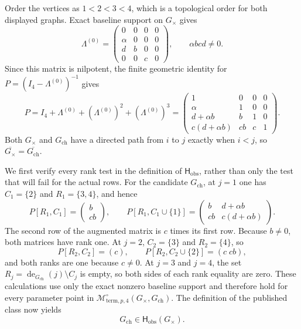 Order the vertices as \(1<2<3<4\), which is a topological order for both displayed graphs.  Exact baseline support on \(G_{\times}\) gives
\[
\Lambda^{(0)}=
\begin{pmatrix}
0&0&0&0\\
\alpha&0&0&0\\
d&b&0&0\\
0&0&c&0
\end{pmatrix},
\qquad \alpha b c d\ne0.
\]
Since this matrix is nilpotent, the finite geometric identity for \(P=(I_4-\Lambda^{(0)})^{-1}\) gives
\[
P=I_4+\Lambda^{(0)}+(\Lambda^{(0)})^2+(\Lambda^{(0)})^3
=
\begin{pmatrix}
1&0&0&0\\
\alpha&1&0&0\\
d+\alpha b&b&1&0\\
c(d+\alpha b)&cb&c&1
\end{pmatrix}.
\]
Both \(G_{\times}\) and \(G_{\mathrm{ch}}\) have a directed path from \(i\) to \(j\) exactly when \(i<j\), so \(\overline{G_{\times}}=\overline{G_{\mathrm{ch}}}\).

We first verify every rank test in the definition of \(\mathsf H_{\mathrm{obs}}\), rather than only the test that will fail for the actual rows.  For the candidate \(G_{\mathrm{ch}}\), at \(j=1\) one has \(C_1=\{2\}\) and \(R_1=\{3,4\}\), and hence
\[
P[R_1,C_1]=\begin{pmatrix}b\\cb\end{pmatrix},
\qquad
P[R_1,C_1\cup\{1\}]
=\begin{pmatrix}
b&d+\alpha b\\
cb&c(d+\alpha b)
\end{pmatrix}.
\]
The second row of the augmented matrix is \(c\) times its first row.  Because \(b\ne0\), both matrices have rank one.  At \(j=2\), \(C_2=\{3\}\) and \(R_2=\{4\}\), so
\[
P[R_2,C_2]=(c),
\qquad
P[R_2,C_2\cup\{2\}]=(c\;cb),
\]
and both ranks are one because \(c\ne0\).  At \(j=3\) and \(j=4\), the set \(R_j=\operatorname{de}_{G_{\mathrm{ch}}}(j)\setminus C_j\) is empty, so both sides of each rank equality are zero.  These calculations use only the exact nonzero baseline support and therefore hold for every parameter point in \(\mathcal M^{\circ}_{\mathrm{term},p,4}(G_{\times},G_{\mathrm{ch}})\).  The definition of the published class now yields
\[
G_{\mathrm{ch}}\in\mathsf H_{\mathrm{obs}}(G_{\times}).
\]

